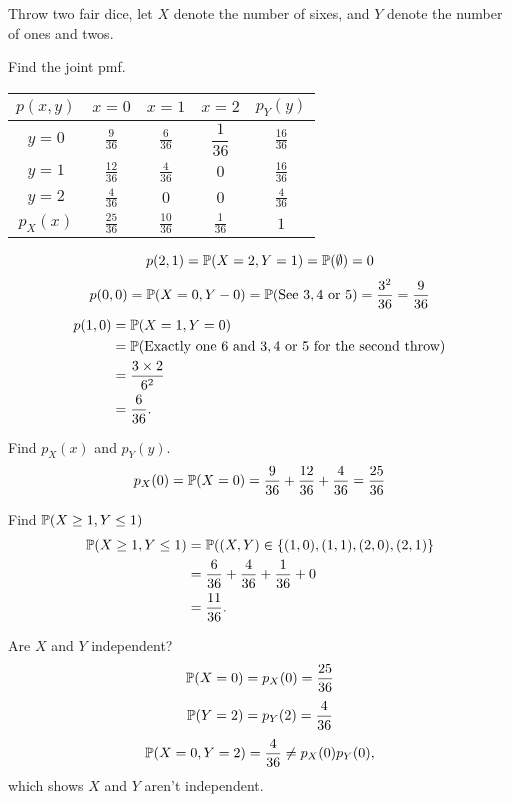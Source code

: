 \documentclass[10pt, a4paper]{article}
\begin{document}
\begin{example}
    Throw two fair dice,
    let $X$ denote the number of sixes,
    and $Y$ denote the number of ones and twos.

    Find the joint pmf.
    \begin{table}[H]
        \centering
        \begin{tabular}{c|ccc|c}
             $p(x, y)$ & $x = 0$ & $x = 1$ & $x = 2$ & $p_Y(y)$ \\
             \hline
             $y = 0$ & $\frac{9}{36}$ & $\frac{6}{36}$ & $\dfrac{1}{36}$ & $\frac{16}{36}$ \\
             $y = 1$ & $\frac{12}{36}$ & $\frac{4}{36}$ & $0$ & $\frac{16}{36}$ \\
             $y = 2$ & $\frac{4}{36}$ & $0$ & $0$ & $\frac{4}{36}$ \\
             \hline
             $p_X(x)$ & $\frac{25}{36}$ & $\frac{10}{36}$ & $\frac{1}{36}$ & $1$
        \end{tabular}
    \end{table}
    \[
    p(2, 1) = \P(X = 2, Y = 1) = \P(\emptyset) = 0
    \]
    \[
    p(0, 0) = \P(X = 0, Y - 0) = \P(\text{See $3, 4$ or $5$}) = \frac{3 ^ 2}{36} = \frac{9}{36}
    \]
    \begin{align*}
        p(1, 0) &= \P(X = 1, Y = 0) \\
        &= \P(\text{Exactly one $6$ and $3, 4$ or $5$ for the second throw}) \\
        &= \frac{3 \times 2}{6 ^ 2} \\
        &= \frac{6}{36}.
    \end{align*}

    Find $p_X(x)$ and $p_Y(y)$.
    \[
    p_X(0) = \P(X = 0) = \frac{9}{36} + \frac{12}{36} + \frac{4}{36} = \frac{25}{36}
    \]
    
    Find $\P(X \geq 1, Y \leq 1)$
    \begin{align*}
        \P(X \geq 1, Y \leq 1) &= \P((X, Y) \in \{(1, 0), (1, 1), (2, 0), (2, 1)\} \\
        &= \frac{6}{36} + \frac{4}{36} + \frac{1}{36} + 0 \\
        &= \frac{11}{36}.
    \end{align*}

    Are $X$ and $Y$ independent?
    \[
    \P(X = 0) = p_X(0) = \frac{25}{36}
    \]
    \[
    \P(Y = 2) = p_Y(2) = \frac{4}{36}
    \]
    \[
    \P(X = 0, Y = 2) = \frac{4}{36} \neq p_X(0)p_Y(0),
    \]
    which shows $X$ and $Y$ aren't independent.
\end{example}
\end{document}
